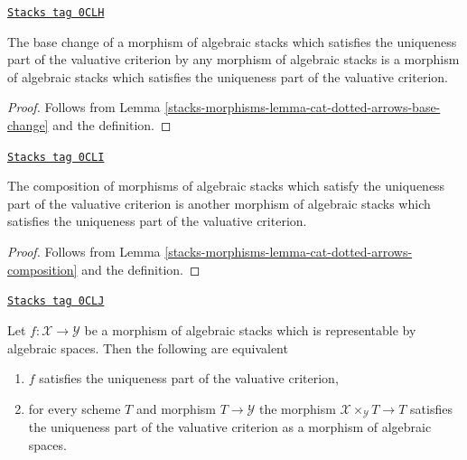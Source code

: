\begin{lemma}
\label{stacks-morphisms-lemma-base-change-uniqueness}
\href{https://stacks.math.columbia.edu/tag/0CLH}{\texttt{Stacks tag 0CLH}}

The base change of a morphism of algebraic stacks which satisfies the
uniqueness part of the valuative criterion by any morphism of
algebraic stacks is a morphism of algebraic stacks which satisfies the
uniqueness part of the valuative criterion.
\end{lemma}

\begin{proof}
Follows from Lemma \ref{stacks-morphisms-lemma-cat-dotted-arrows-base-change}
and the definition.
\end{proof}

\begin{lemma}
\label{stacks-morphisms-lemma-composition-uniqueness}
\href{https://stacks.math.columbia.edu/tag/0CLI}{\texttt{Stacks tag 0CLI}}

The composition of morphisms of algebraic stacks which satisfy the
uniqueness part of the valuative criterion is another
morphism of algebraic stacks which satisfies the
uniqueness part of the valuative criterion.
\end{lemma}

\begin{proof}
Follows from Lemma \ref{stacks-morphisms-lemma-cat-dotted-arrows-composition}
and the definition.
\end{proof}

\begin{lemma}
\label{stacks-morphisms-lemma-uniqueness-representable}
\href{https://stacks.math.columbia.edu/tag/0CLJ}{\texttt{Stacks tag 0CLJ}}

Let $f : \mathcal{X} \to \mathcal{Y}$ be a morphism of algebraic stacks
which is representable by algebraic spaces. Then the following are equivalent
\begin{enumerate}
\item $f$ satisfies the uniqueness part of the valuative criterion,
\item for every scheme $T$ and morphism $T \to \mathcal{Y}$
the morphism $\mathcal{X} \times_\mathcal{Y} T \to T$ satisfies
the uniqueness part of the valuative criterion as a morphism
of algebraic spaces.
\end{enumerate}
\end{lemma}

